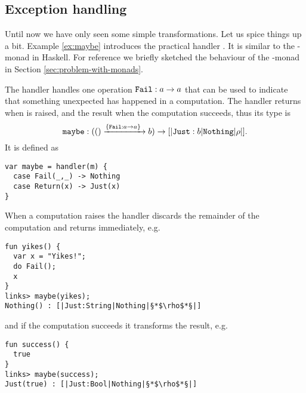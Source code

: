 \subsection{Exception handling}\label{sec:maybehandler}
Until now we have only seen some simple transformations. Let us spice things up a bit. 
Example \ref{ex:maybe} introduces the practical handler . It is similar to the -monad in Haskell. For reference we briefly sketched the behaviour of the -monad in Section \ref{sec:problem-with-monads}.
\begin{example}\label{ex:maybe}
The  handler handles one operation $\texttt{Fail} : a \to a$ that can be used to indicate that something unexpected has happened in a computation. The handler returns  when  is raised, and  the result when the computation succeeds, thus its type is
\[ \texttt{maybe} : (() \xrightarrow{\left\{\texttt{Fail} : a \to a \right\}\;} b) \to [|\texttt{Just}:b|\texttt{Nothing}|\rho|]. \]
It is defined as
\begin{lstlisting}[style=links]
var maybe = handler(m) {
  case Fail(_,_) -> Nothing
  case Return(x) -> Just(x)
}
\end{lstlisting}
When a computation raises  the handler discards the remainder of the computation and returns  immediately, e.g.
\begin{lstlisting}[style=links]
fun yikes() { 
  var x = "Yikes!";
  do Fail();
  x
}
links> maybe(yikes);
Nothing() : [|Just:String|Nothing|§*$\rho$*§|]
\end{lstlisting}
and if the computation succeeds it transforms the result, e.g.
\begin{lstlisting}[style=links]
fun success() {
  true
}
links> maybe(success);
Just(true) : [|Just:Bool|Nothing|§*$\rho$*§|]
\end{lstlisting}
\end{example}

